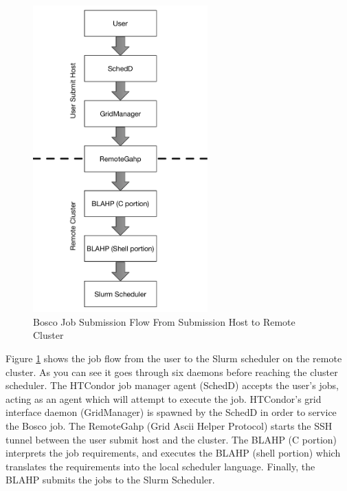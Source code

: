 \begin{figure}[h!t]
	\centering
	\includegraphics[width=0.6\textwidth]{images/JobSubmitFlow.pdf}
	\caption{Bosco Job Submission Flow From Submission Host to Remote Cluster}
	\label{fig:boscojobsubmitflow}
\end{figure}

Figure \ref{fig:boscojobsubmitflow} shows the job flow from the user to the Slurm scheduler on the remote cluster.  As you can see it goes through six daemons before reaching the cluster scheduler.  The HTCondor job manager agent (SchedD) accepts the user's jobs, acting as an agent which will attempt to execute the job.  HTCondor's grid interface daemon (GridManager) is spawned by the SchedD in order to service the Bosco job.  The RemoteGahp (Grid Ascii Helper Protocol) starts the SSH tunnel between the user submit host and the cluster.  The BLAHP (C portion) interprets the job requirements, and executes the BLAHP (shell portion) which translates the requirements into the local scheduler language.  Finally, the BLAHP submits the jobs to the Slurm Scheduler.

